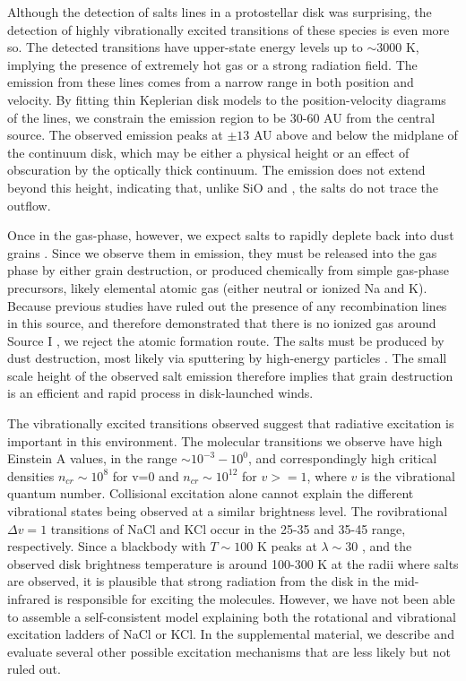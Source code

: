 \documentclass[12pt]{article}
\begin{document}
Although the detection of salts lines in a protostellar disk was surprising,
the detection of highly vibrationally excited transitions of these species is
even more so.  The detected transitions have upper-state energy levels up to
$\sim3000$ K, implying the presence of extremely hot gas or a strong radiation
field. The emission from these lines comes from a narrow range in both position
and velocity.  By fitting thin Keplerian disk models to the position-velocity
diagrams of the lines, we constrain the emission region to be 30-60 AU from
the central source.  The observed emission peaks at $\pm13$ AU above and below
the midplane of the continuum disk, which may be either a physical height or an
effect of obscuration by the optically thick continuum.  The emission does not
extend beyond this height, indicating that, unlike SiO and \water, the salts do
not trace the outflow.

Once in the gas-phase, however, we expect salts to rapidly deplete back into
dust grains \citep{Cherncheff2012a}.  Since we observe them in emission, they
must be released into the gas phase by either grain destruction, or produced
chemically from simple gas-phase precursors, likely elemental atomic gas
(either neutral or ionized Na and K).  Because previous studies have ruled out
the presence of any recombination lines in this source, and therefore
demonstrated that there is no ionized gas around Source I
\citep{Plambeck2016a,Baez-Rubio2018a}, we reject the atomic formation route.
The salts must be produced by dust destruction, most likely via sputtering by
high-energy particles \citep{Schilke1997a}.  The small scale height of the
observed salt emission therefore implies that grain destruction is an efficient
and rapid process in disk-launched winds.

The vibrationally excited transitions observed suggest that radiative
excitation is important in this environment.  The molecular transitions we
observe have high Einstein A values, in the range $\sim10^{-3}-10^0$, and
correspondingly high critical densities $n_{cr} \sim10^{8}$ \percc for v=0
and $n_{cr} \sim 10^{12}$ for $v>=1$, where $v$
is the vibrational quantum number.  Collisional excitation alone cannot explain
the different vibrational states being observed at a similar brightness level.
The rovibrational $\Delta v=1$ transitions of NaCl and KCl occur in the 25-35
\um and 35-45 \um range, respectively.  Since a blackbody with $T\sim100$ K
peaks at $\lambda\sim30$ \um, and the observed disk brightness temperature is
around 100-300 K at the radii where salts are observed, it is plausible that
strong radiation from the disk in the mid-infrared is responsible for exciting
the molecules.  However, we have not been able to assemble a self-consistent
model explaining both the rotational and vibrational excitation ladders of NaCl
or KCl.  In the supplemental material, we describe  and evaluate several other
possible excitation mechanisms that are less likely but not ruled out.
\end{document}
